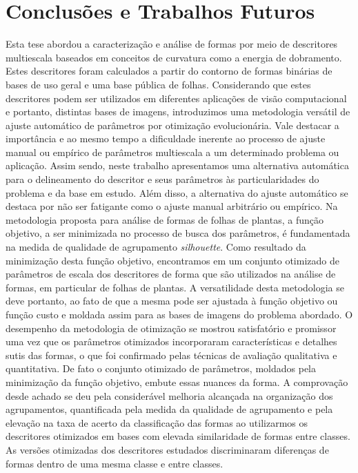 \chapter{Conclusões e Trabalhos Futuros \label{chap:ch5}}

Esta tese abordou a caracterização e análise de formas por meio de descritores multiescala baseados em conceitos de curvatura como a energia de dobramento. Estes descritores foram calculados a partir do contorno de formas binárias de bases de uso geral e uma base pública de folhas. Considerando que estes descritores podem ser utilizados em diferentes aplicações de visão computacional e portanto, distintas bases de imagens, introduzimos uma metodologia versátil de ajuste automático de parâmetros por otimização evolucionária. Vale destacar a importância e ao mesmo tempo a dificuldade inerente ao processo de ajuste manual ou empírico de parâmetros multiescala a um determinado problema ou aplicação. Assim sendo, neste trabalho apresentamos uma alternativa automática para o delineamento do descritor e seus parâmetros às particularidades do problema  e da base em estudo.  
Além disso, a alternativa do ajuste automático se destaca por não ser fatigante como o ajuste manual arbitrário ou empírico.
Na metodologia proposta para análise de formas de folhas de plantas, a função objetivo, a ser minimizada no processo de busca dos parâmetros, é fundamentada na medida de qualidade de agrupamento \textit{silhouette}. Como resultado da minimização desta função objetivo, encontramos em um conjunto otimizado de parâmetros de escala dos descritores de forma que são utilizados na análise de formas, em particular de folhas de plantas.  A versatilidade desta metodologia se deve portanto, ao fato de que a mesma pode ser ajustada à função  objetivo ou função custo e moldada assim para as bases de imagens do problema abordado.
O desempenho da metodologia de otimização se mostrou satisfatório e promissor uma vez que os parâmetros otimizados incorporaram características e detalhes sutis das formas, o que foi confirmado pelas técnicas de avaliação qualitativa e quantitativa. De fato o conjunto otimizado de parâmetros, moldados pela minimização da função objetivo,  embute essas nuances da forma. A comprovação desde achado se deu pela considerável melhoria alcançada na organização dos agrupamentos, quantificada pela medida da qualidade de agrupamento e pela elevação na taxa de acerto da classificação das formas ao utilizarmos os descritores otimizados em bases com elevada similaridade de formas entre classes. As versões otimizadas dos descritores estudados discriminaram diferenças de formas dentro de uma mesma classe e entre classes.  
